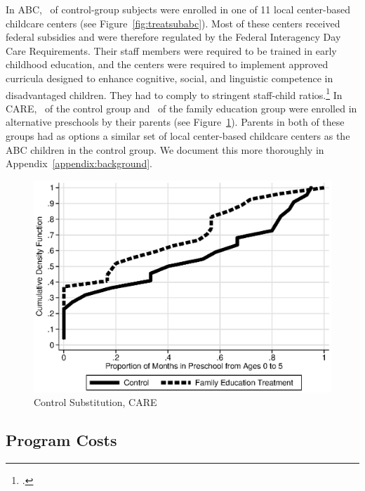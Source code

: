 \noindent In ABC, \treatsubsabc\ of control-group subjects were enrolled in one of 11 local center-based childcare centers (see Figure~\ref{fig:treatsubabc}). Most of these centers received federal subsidies and were therefore regulated by the Federal Interagency Day Care Requirements. Their staff members were required to be trained in early childhood education, and the centers were required to implement approved curricula designed to enhance cognitive, social, and linguistic competence in disadvantaged children. They had to comply to stringent staff-child ratios.\footnote{\citet{Burchinal_etal_1989_CD_Daycare-Pre-K-Dev}.} In CARE, \treatsubscarec\ of the control group and \treatsubscaref\ of the family education group were enrolled in alternative preschools by their parents (see Figure~\ref{fig:treatsubcare}). Parents in both of these groups had as options a similar set of local center-based childcare centers as the ABC children in the control group. We document this more thoroughly in Appendix~\ref{appendix:background}.

\begin{figure}[H]
		\caption{Control Substitution, CARE} \label{fig:treatsubcare}
		\includegraphics[width=.9\columnwidth]{output/care_controlcontamination_months.eps}
\end{figure}

\subsection{Program Costs}

